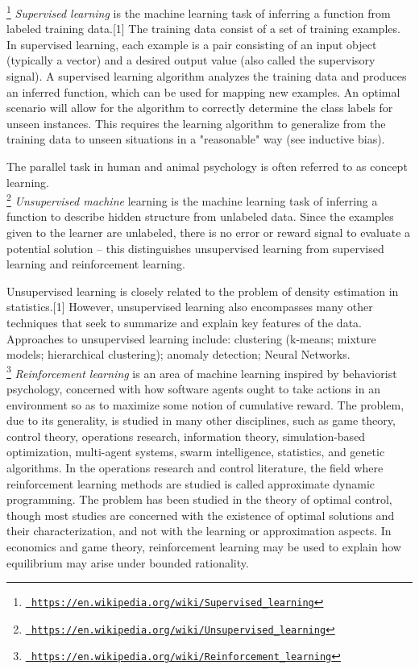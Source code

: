 \documentclass[11pt]{article}
\begin{document}
\footnote{\href{https://en.wikipedia.org/wiki/Supervised_learning}{\tt
https://en.wikipedia.org/wiki/Supervised\_learning}} {\it Supervised
learning} is the machine learning task of inferring a function from
labeled training data.[1] The training data consist of a set of
training examples. In supervised learning, each example is a pair
consisting of an input object (typically a vector) and a desired
output value (also called the supervisory signal). A supervised
learning algorithm analyzes the training data and produces an inferred
function, which can be used for mapping new examples. An optimal
scenario will allow for the algorithm to correctly determine the class
labels for unseen instances. This requires the learning algorithm to
generalize from the training data to unseen situations in a
"reasonable" way (see inductive bias).

The parallel task in human and animal psychology is often referred to
as concept learning.\\


\footnote{\href{https://en.wikipedia.org/wiki/Unsupervised_learning}{\tt
https://en.wikipedia.org/wiki/Unsupervised\_learning}}{\it
Unsupervised machine} learning is the machine learning task of
inferring a function to describe hidden structure from unlabeled
data. Since the examples given to the learner are unlabeled, there is
no error or reward signal to evaluate a potential solution – this
distinguishes unsupervised learning from supervised learning and
reinforcement learning.

Unsupervised learning is closely related to the problem of density
estimation in statistics.[1] However, unsupervised learning also
encompasses many other techniques that seek to summarize and explain
key features of the data.  Approaches to unsupervised learning
include: clustering (k-means; mixture models; hierarchical
clustering); anomaly detection; Neural Networks. \\


\footnote{\href{https://en.wikipedia.org/wiki/Reinforcement_learning}{\tt
https://en.wikipedia.org/wiki/Reinforcement\_learning}}{\it
Reinforcement learning} is an area of machine learning inspired by
behaviorist psychology, concerned with how software agents ought to
take actions in an environment so as to maximize some notion of
cumulative reward. The problem, due to its generality, is studied in
many other disciplines, such as game theory, control theory,
operations research, information theory, simulation-based
optimization, multi-agent systems, swarm intelligence, statistics, and
genetic algorithms. In the operations research and control literature,
the field where reinforcement learning methods are studied is called
approximate dynamic programming. The problem has been studied in the
theory of optimal control, though most studies are concerned with the
existence of optimal solutions and their characterization, and not
with the learning or approximation aspects. In economics and game
theory, reinforcement learning may be used to explain how equilibrium
may arise under bounded rationality.
\end{document}
